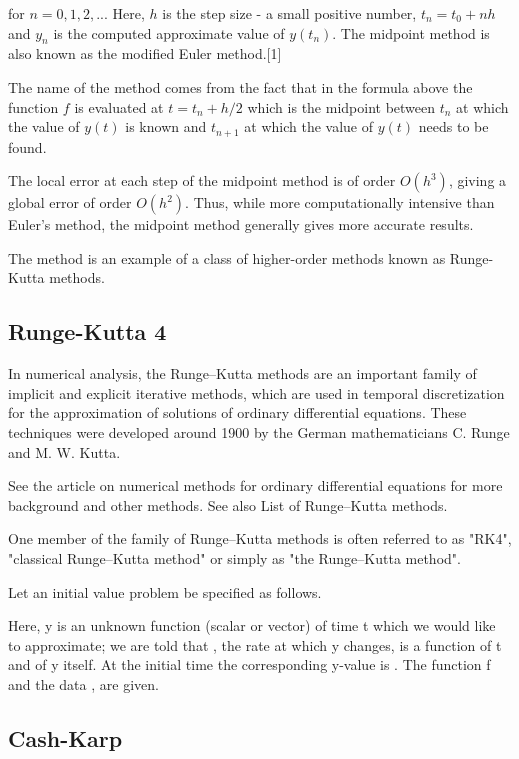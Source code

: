 for $n=0,1,2,...$  Here, $h$ is the step size - a small positive number, $t_n=t_0+nh$ and $y_n$ is the computed approximate value of $y(t_n)$. The midpoint method is also known as the modified Euler method.[1]

The name of the method comes from the fact that in the formula above the function $f$ is evaluated at $t=t_n+h/2$ which is the midpoint between $t_n$ at which the value of $y(t)$ is known and $t_{n+1}$ at which the value of $y(t)$ needs to be found.

The local error at each step of the midpoint method is of order $O(h^3)$, giving a global error of order $O(h^2)$. Thus, while more computationally intensive than Euler's method, the midpoint method generally gives more accurate results.

The method is an example of a class of higher-order methods known as Runge-Kutta methods.




\subsection{Runge-Kutta 4}
\label{RungeKutta4}

In numerical analysis, the Runge–Kutta methods are an important family of implicit and explicit iterative methods, which are used in temporal discretization for the approximation of solutions of ordinary differential equations. These techniques were developed around 1900 by the German mathematicians C. Runge and M. W. Kutta.

See the article on numerical methods for ordinary differential equations for more background and other methods. See also List of Runge–Kutta methods.

One member of the family of Runge–Kutta methods is often referred to as "RK4", "classical Runge–Kutta method" or simply as "the Runge–Kutta method".

Let an initial value problem be specified as follows.


Here, y is an unknown function (scalar or vector) of time t which we would like to approximate; we are told that , the rate at which y changes, is a function of t and of y itself. At the initial time  the corresponding y-value is . The function f and the data ,  are given.




\subsection{Cash-Karp}
\label{CashKarp}

